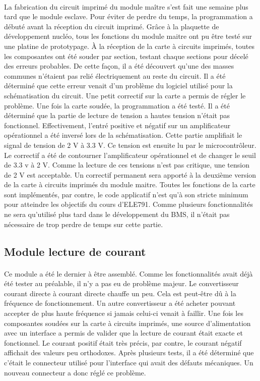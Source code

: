 		\paragraph{}
		La fabrication du circuit imprimé du module maître s’est fait une semaine plus tard que le module esclave. Pour éviter de perdre du temps, la programmation a débuté avant la réception du circuit imprimé. Grâce à la plaquette de développement nucléo, tous les fonctions du module maitre ont pu être testé sur une platine de prototypage.
		À la réception de la carte à circuits imprimés, toutes les composantes ont été souder par section, testant chaque sections pour décelé des erreurs probables. De cette façon, il a été découvert qu’une des masses communes n’étaient pas relié électriquement au reste du circuit. Il a été déterminé que cette erreur venait d’un problème du logiciel utilisé pour la schématisation du circuit. Une petit correctif sur la carte a permis de régler le problème.
		Une fois la carte soudée, la programmation a été testé. Il a été déterminé que la partie de lecture de tension a hautes tension n’était pas fonctionnel. Effectivement, l’entré positive et négatif sur un amplificateur opérationnel a été inversé lors de la schématisation. Cette partie amplifiait le signal de tension de 2 V à 3.3 V. Ce tension est ensuite lu par le microcontrôleur. Le correctif a été de contourner l’amplificateur opérationnel et de changer le seuil de 3.3 v à 2 V. Comme la lecture de ces tensions n’est pas critique, une tension de 2 V est acceptable. Un correctif permanent sera apporté à la deuxième version de la carte à circuits imprimés du module maitre.
		Toutes les fonctions de la carte sont implémentés, par contre, le code applicatif n’est qu’à son stricte minimum pour atteindre les objectifs du cours d’ELE791. Comme plusieurs fonctionnalités ne sera qu’utilisé plus tard dans le développement du BMS, il n’était pas nécessaire de trop perdre de temps sur cette partie.
		
	\subsection{Module lecture de courant}
		
		\paragraph{}
		Ce module a été le dernier à être assemblé. Comme les fonctionnalités avait déjà été tester au préalable, il n’y a pas eu de problème majeur.
		Le convertisseur courant directe à courant directe chauffe un peu. Cela est peut-être dû à la fréquence de fonctionnement. Un autre convertisseur a été acheter pouvant accepter de plus haute fréquence si jamais celui-ci venait à faillir.
		Une fois les composantes soudées sur la carte à circuits imprimés, une source d’alimentation avec un interface a permis de valider que la lecture de courant était exacte et fonctionnel. Le courant positif était très précis, par contre, le courant négatif affichait des valeurs peu orthodoxes. Après plusieurs tests, il a été déterminé que c’était le connecteur utilisé pour l’interface qui avait des défauts mécaniques. Un nouveau connecteur a donc réglé ce problème.
		
